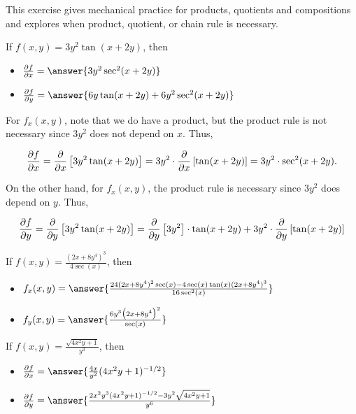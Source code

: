 \documentclass{ximera}
\author{Jim Talamo}
\newcommand{\Pp}[2]{\frac{\partial #1}{\partial #2}}
\begin{document}
This exercise gives mechanical practice for products, quotients and compositions and explores when product, quotient, or chain rule is necessary.


\begin{exercise}
If $f(x,y) = 3y^2 \tan(x+2y)$, then 

\begin{itemize}
\item $\Pp{f}{x} = \answer{3y^2\sec^2(x+2y)}$
\item $\Pp{f}{y} = \answer{6y \tan(x+2y) + 6y^2 \sec^2(x+2y)}$
\end{itemize}

\begin{hint}
For $f_x(x,y)$, note that we do have a product, but the product rule is not necessary since $3y^2$ does not depend on $x$.  Thus,

\[
\Pp{f}{x} = \pp{x} \left[ 3y^2 \tan(x+2y) \right] = 3y^2 \cdot \pp{x} \left[ \tan(x+2y) \right] = 3y^2  \cdot \sec^2(x+2y) .
\]

On the other hand, for $f_x(x,y)$, the product rule is necessary since $3y^2$ does depend on $y$.  Thus,

\[
\Pp{f}{y} = \pp{y} \left[ 3y^2 \tan(x+2y) \right] =   \pp{y}  \left[ 3y^2 \right]  \cdot \tan(x+2y)+ 3y^2 \cdot \pp{y} \left[ \tan(x+2y) \right] 
\]
\end{hint}
\end{exercise}


\begin{exercise}
If $f(x,y) = \frac{(2x+8y^4)^3}{4\sec(x)}$, then 

\begin{itemize}
\item $f_x(x,y) = \answer{\frac{24(2x+8y^4)^2 \sec(x) - 4\sec(x)\tan(x) (2x+8y^4)^3}{16 \sec^2(x)}  }$
\item $f_y(x,y) = \answer{\frac{6y^3 \big(2x+8y^4\big)^2}{\sec(x)}}$
\end{itemize}


\end{exercise}


\begin{exercise}
If $f(x,y) = \frac{\sqrt{4x^2y+1}}{y^3}$, then 

\begin{itemize}
\item $\Pp{f}{x} = \answer{\frac{4x}{y^2} (4x^2y+1)^{-1/2} }$
\item $\Pp{f}{y} = \answer{\frac{2x^2y^3 (4x^2y+1)^{-1/2} - 3y^2\sqrt{4x^2y+1}}{y^6} }$
\end{itemize}


\end{exercise}
\end{document}
